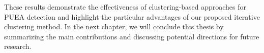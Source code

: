 These results demonstrate the effectiveness of clustering-based approaches for PUEA detection and highlight the particular advantages of our proposed iterative clustering method. In the next chapter, we will conclude this thesis by summarizing the main contributions and discussing potential directions for future research.
